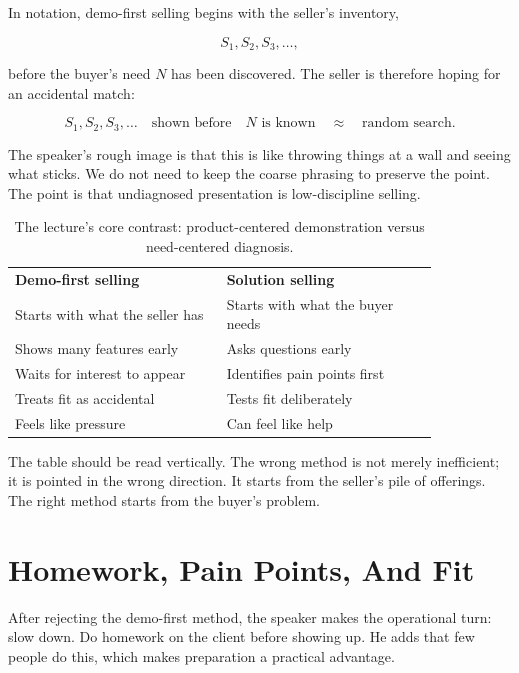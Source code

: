 In notation, demo-first selling begins with the seller's inventory,

\begin{equation}
S_1,S_2,S_3,\ldots,
\end{equation}

before the buyer's need \(N\) has been discovered. The seller is therefore hoping for an accidental match:

\begin{equation}
S_1,S_2,S_3,\ldots
\quad \text{shown before} \quad
N \text{ is known}
\quad
\approx
\quad
\text{random search}.
\end{equation}

The speaker's rough image is that this is like throwing things at a wall and seeing what sticks. We do not need to keep the coarse phrasing to preserve the point. The point is that undiagnosed presentation is low-discipline selling.

\begin{table}
\centering
\begin{tabular}{p{0.42\linewidth}p{0.42\linewidth}}
\textbf{Demo-first selling} & \textbf{Solution selling} \\
Starts with what the seller has & Starts with what the buyer needs \\
Shows many features early & Asks questions early \\
Waits for interest to appear & Identifies pain points first \\
Treats fit as accidental & Tests fit deliberately \\
Feels like pressure & Can feel like help \\
\end{tabular}
\caption{The lecture's core contrast: product-centered demonstration versus need-centered diagnosis.}
\end{table}

The table should be read vertically. The wrong method is not merely inefficient; it is pointed in the wrong direction. It starts from the seller's pile of offerings. The right method starts from the buyer's problem.

\section{Homework, Pain Points, And Fit}

After rejecting the demo-first method, the speaker makes the operational turn: slow down. Do homework on the client before showing up. He adds that few people do this, which makes preparation a practical advantage.


